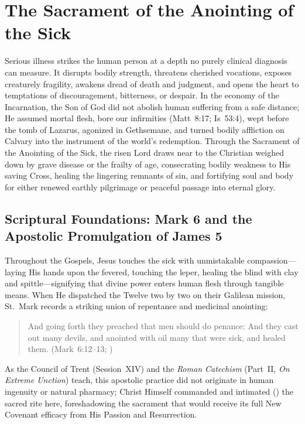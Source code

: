 \section{The Sacrament of the Anointing of the Sick}
\label{sec:anointing}

Serious illness strikes the human person at a depth no purely clinical diagnosis can measure. It disrupts bodily strength, threatens cherished vocations, exposes creaturely fragility, awakens dread of death and judgment, and opens the heart to temptations of discouragement, bitterness, or despair. In the economy of the Incarnation, the Son of God did not abolish human suffering from a safe distance; He assumed mortal flesh, bore our infirmities (Matt~8:17; Is~53:4), wept before the tomb of Lazarus, agonized in Gethsemane, and turned bodily affliction on Calvary into the instrument of the world's redemption. Through the Sacrament of the Anointing of the Sick, the risen Lord draws near to the Christian weighed down by grave disease or the frailty of age, consecrating bodily weakness to His saving Cross, healing the lingering remnants of sin, and fortifying soul and body for either renewed earthly pilgrimage or peaceful passage into eternal glory.

\subsection{Scriptural Foundations: Mark 6 and the Apostolic Promulgation of James 5}
\label{subsec:anointing-scripture}

Throughout the Gospels, Jesus touches the sick with unmistakable compassion---laying His hands upon the fevered, touching the leper, healing the blind with clay and spittle---signifying that divine power enters human flesh through tangible means. When He dispatched the Twelve two by two on their Galilean mission, St.~Mark records a striking union of repentance and medicinal anointing:
\begin{quotation}
And going forth they preached that men should do penance: And they cast out many devils, and anointed with oil many that were sick, and healed them. (Mark~6:12--13; )
\end{quotation}
As the Council of Trent (Session~XIV) and the \emph{Roman Catechism} (Part~II, \emph{On Extreme Unction}) teach, this apostolic practice did not originate in human ingenuity or natural pharmacy; Christ Himself commanded and intimated () the sacred rite here, foreshadowing the sacrament that would receive its full New Covenant efficacy from His Passion and Resurrection.

